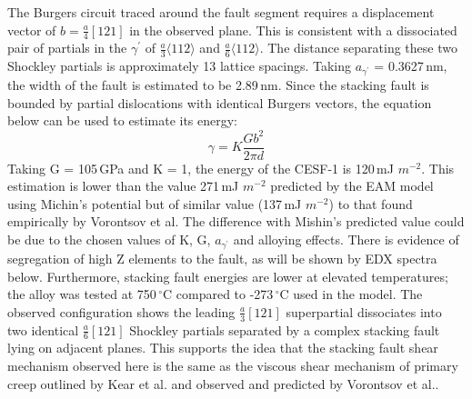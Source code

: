 \documentclass[a4paper,12pt,times,numbered,print,index]{Classes/PhDThesisPSnPDF}
\begin{document}


The Burgers circuit traced around the fault segment requires a displacement vector of $b=\frac{a}{4}[121]$ in the observed plane. This is consistent with a dissociated pair of partials in the $\gamma^\prime$ of $\frac{a}{3}\langle 112\rangle$ and $\frac{a}{6}\langle 112\rangle$. The distance separating these two Shockley partials is approximately 13 lattice spacings. Taking $a_{\gamma^{\prime}}$ = 0.3627\,nm, the width of the fault is estimated to be 2.89\,nm. Since the stacking fault is bounded by partial dislocations with identical Burgers vectors, the equation below can be used to estimate its energy:
\begin{equation}
\gamma = K\frac{Gb^{2}}{2\pi d}
\end{equation}
Taking G = 105\,GPa and K = 1, the energy of the CESF-1 is 120\,mJ $m^{-2}$. This estimation is lower than the value 271\,mJ $m^{-2}$ predicted by the EAM model using Michin's potential but of similar value (137\,mJ $m^{-2}$) to that found empirically by Vorontsov et al.\cite{}\cite{}  The difference with Mishin's predicted value could be due to the chosen values of K, G, $a_{\gamma^{\prime}}$ and alloying effects. There is evidence of segregation of high Z elements to the fault, as will be shown by EDX spectra below. Furthermore, stacking fault energies are lower at elevated temperatures; the alloy was tested at 750\,$^\circ$C compared to -273\,$^\circ$C used in the model. The observed configuration shows the leading $\frac{a}{3}[121]$ superpartial dissociates into two identical $\frac{a}{6}[121]$ Shockley partials separated by a complex stacking fault lying on adjacent planes. This supports the idea that the stacking fault shear mechanism observed here is the same as the viscous shear mechanism of primary creep outlined by Kear et al.\cite{} and observed and predicted by Vorontsov et al.\cite{}.
\end{document}

